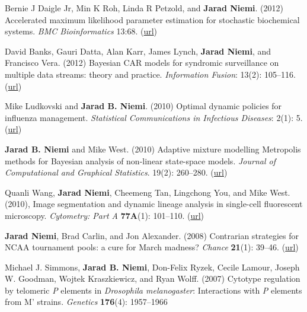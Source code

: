 \documentclass[overlapped,line]{res}
\newcommand{\sinceappt}{}
\begin{document}
\begin{resume}
Bernie J Daigle Jr, Min K Roh, Linda R Petzold, and {\bf Jarad Niemi}. (2012) Accelerated maximum likelihood parameter estimation for stochastic biochemical systems. \emph{BMC Bioinformatics} 13:68. (\href{http://www.biomedcentral.com/1471-2105/13/68}{url})

\sinceappt

David Banks, Gauri Datta, Alan Karr, James Lynch, {\bf Jarad Niemi}, and Francisco Vera. (2012) Bayesian CAR models for syndromic surveillance on multiple data streams: theory and practice. \emph{Information Fusion}: 13(2): 105--116. (\href{http://www.sciencedirect.com/science/article/pii/S156625350900092X}{url})

Mike Ludkovski and {\bf Jarad B. Niemi}. (2010) Optimal dynamic policies for influenza management. \emph{Statistical Communications in Infectious Diseases}: 2(1): 5. (\href{http://www.degruyter.com/view/j/scid.2010.2.1/scid.2010.2.1.1020/scid.2010.2.1.1020.xml}{url})

{\bf Jarad B. Niemi} and Mike West. (2010) Adaptive mixture modelling Metropolis methods for Bayesian analysis of non-linear state-space models. \emph{Journal of Computational and Graphical Statistics}. 19(2): 260--280. (\href{http://www.tandfonline.com/doi/abs/10.1198/jcgs.2010.08117}{url})

Quanli Wang, {\bf Jarad Niemi}, Cheemeng Tan, Lingchong You, and Mike West. (2010), Image segmentation and dynamic lineage analysis in single-cell fluorescent microscopy. \emph{Cytometry: Part A} {\bf 77A}(1): 101--110. (\href{http://onlinelibrary.wiley.com/doi/10.1002/cyto.a.20812/full}{url})

{\bf Jarad Niemi}, Brad Carlin, and Jon Alexander. (2008) Contrarian strategies for NCAA tournament pools: a cure for March madness? \emph{Chance} {\bf 21}(1): 39--46. (\href{http://amstat.tandfonline.com/doi/pdf/10.1080/09332480.2008.10722884}{url})


Michael J. Simmons, {\bf Jarad B. Niemi}, Don-Felix Ryzek, Cecile Lamour, Joseph W. Goodman, Wojtek Kraszkiewicz, and Ryan Wolff. (2007) Cytotype regulation by telomeric \emph{P} elements in \emph{Drosophila melanogaster}: Interactions with \emph{P} elements from M' strains. \emph{Genetics} {\bf 176}(4): 1957--1966


\end{resume}
\end{document}
